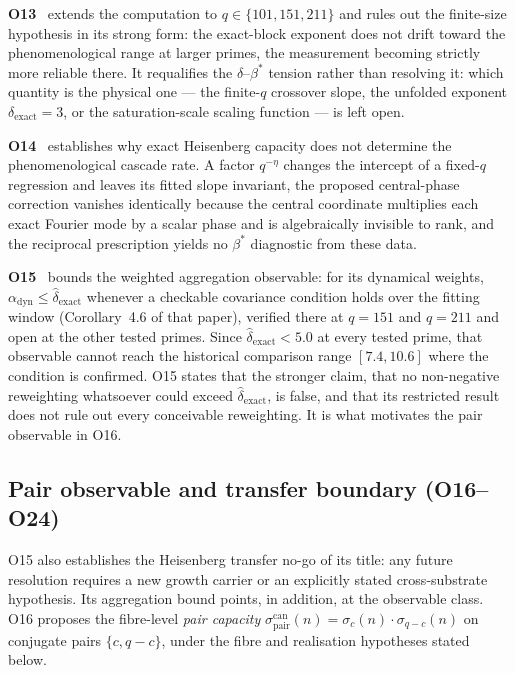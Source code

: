 \documentclass[11pt,a4paper]{article}
\theoremstyle{definition}
\newcommand{\betastar}{\beta^*}
\newcommand{\spair}{\sigma^{\mathrm{can}}_{\mathrm{pair}}}
\begin{document}
      \textbf{O13}~\cite{Beau2026a17} extends the computation to $q \in \{101, 151, 211\}$ and
      rules out the finite-size hypothesis in its strong form: the exact-block exponent does not
      drift toward the phenomenological range at larger primes, the measurement becoming strictly
      more reliable there.
      It requalifies the $\delta$--$\betastar$ tension rather than resolving it: which quantity is
      the physical one --- the finite-$q$ crossover slope, the unfolded exponent
      $\delta_{\mathrm{exact}} = 3$, or the saturation-scale scaling function --- is left open.

      \textbf{O14}~\cite{Beau2026a18} establishes why exact Heisenberg capacity does not
      determine the phenomenological cascade rate.
      A factor $q^{-\eta}$ changes the intercept of a fixed-$q$ regression and leaves its fitted
      slope invariant, the proposed central-phase correction vanishes identically because the
      central coordinate multiplies each exact Fourier mode by a scalar phase and is algebraically
      invisible to rank, and the reciprocal prescription yields no $\betastar$ diagnostic from
      these data.

      \textbf{O15}~\cite{Beau2026a19} bounds the weighted aggregation observable: for its
      dynamical weights, $\alpha_{\mathrm{dyn}} \leq \hat\delta_{\mathrm{exact}}$ whenever a
      checkable covariance condition holds over the fitting window (Corollary~4.6 of that paper),
      verified there at $q = 151$ and $q = 211$ and open at the other tested primes.
      Since $\hat\delta_{\mathrm{exact}} < 5.0$ at every tested prime, that observable cannot
      reach the historical comparison range $[7.4, 10.6]$ where the condition is confirmed.
      O15 states that the stronger claim, that no non-negative reweighting whatsoever could exceed
      $\hat\delta_{\mathrm{exact}}$, is false, and that its restricted result does not rule out
      every conceivable reweighting.
      It is what motivates the pair observable in O16.

    \subsection{Pair observable and transfer boundary (O16--O24)}
      \label{sec:pair}

      O15 also establishes the Heisenberg transfer no-go of its title: any future resolution
      requires a new growth carrier or an explicitly stated cross-substrate hypothesis.
      Its aggregation bound points, in addition, at the observable class.
      O16 proposes the fibre-level \emph{pair capacity}
      $\spair(n) = \sigma_c(n) \cdot \sigma_{q-c}(n)$ on conjugate pairs $\{c, q-c\}$, under the
      fibre and realisation hypotheses stated below.
\end{document}
